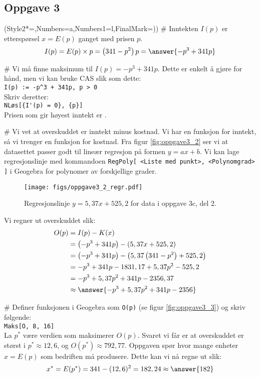 \subsection*{Oppgave 3}
\begin{easylist}[enumerate]
	\ListProperties(Style2*=,Numbers=a,Numbers1=l,FinalMark={)})
	# Inntekten $I(p)$ er etterspørsel $x = E(p)$ ganget med prisen $p$.
	\begin{equation*}
	I(p) = E(p) \times p = \left(341 - p^2\right)p =  \answer{- p^3 + 341p}
	\end{equation*}
	
	# Vi må finne maksimum til $I(p) = - p^3 + 341p$.
	Dette er enkelt å gjøre for hånd, men vi kan bruke CAS slik som dette:\\
	\verb|I(p) := -p^3 + 341p, p > 0|\\
	Skriv deretter: \\
	\verb|NLøs[{I'(p) = 0}, {p}]| \\
	Prisen som gir høyest inntekt er .
	
	
	# Vi vet at overskuddet er inntekt minus kostnad. Vi har en funksjon for inntekt,
	så vi trenger en funksjon for kostnad. 
	Fra figur \eqref{fig:oppgave3_2} ser vi at datasettet passer godt til lineær regresjon på formen $y = ax + b$. Vi kan lage regresjonslinje med kommandoen \texttt{RegPoly[ <Liste med punkt>, <Polynomgrad> ]} i Geogebra for polynomer av forskjellige grader.
	\begin{figure}[th!]
		\centering
		\texttt{[image: figs/oppgave3\_2\_regr.pdf]}
		\caption{Regresjonslinje $y = 5,37x +525,2$ for data i oppgave 3c, del 2.}
		\label{fig:oppgave3_2}
	\end{figure}
	Vi regner ut overskuddet slik:
	\begin{align*}
	O(p) &= I(p) - K(x) \\
	&= \left(- p^3 + 341p\right) - \left(5,37x +525,2\right) \\
	&= \left(- p^3 + 341p\right) - \left(5,37\left(341-p^2\right) +525,2\right) \\
	&= - p^3 + 341p - 1831,17 + 5,37p^2 - 525,2 \\
	&= - p^3 + 5,37p^2 + 341p - 2356,37 \\
	&\approx \answer{- p^3 + 5,37p^2 + 341p - 2356}
	\end{align*}
	
	# Definer funksjonen i Geogebra som \texttt{O(p)} (se figur \eqref{fig:oppgave3_3}) og skriv følgende:\\
	\texttt{Maks[O, 8, 16]}
	\\
	La $p^*$ være verdien som maksimerer $O(p)$. Svaret vi får er at overskuddet er størst i $p^* \approx 12,6$, og $O(p^*) \approx 792,77$.
	Oppgaven spør hvor mange enheter $x = E(p)$ som bedriften må produsere. Dette kan vi nå regne ut slik:
	\begin{equation*}
	x^* = E(p^*) = 341 - (12,6)^2 = 182,24 \approx \answer{182}
	\end{equation*}
	

\end{easylist}
